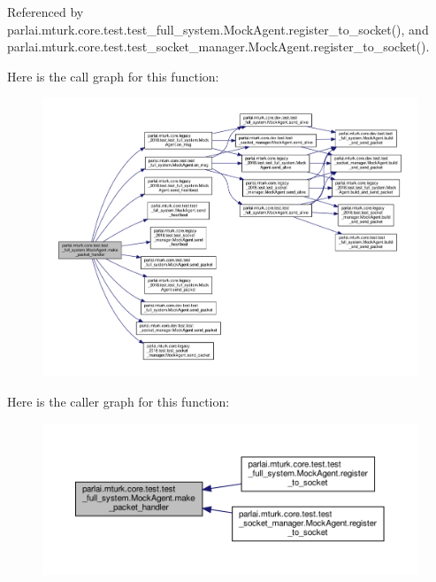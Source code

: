 Referenced by parlai.\+mturk.\+core.\+test.\+test\+\_\+full\+\_\+system.\+Mock\+Agent.\+register\+\_\+to\+\_\+socket(), and parlai.\+mturk.\+core.\+test.\+test\+\_\+socket\+\_\+manager.\+Mock\+Agent.\+register\+\_\+to\+\_\+socket().

Here is the call graph for this function\+:
\nopagebreak
\begin{figure}[H]
\begin{center}
\leavevmode
\includegraphics[width=350pt]{classparlai_1_1mturk_1_1core_1_1test_1_1test__full__system_1_1MockAgent_a872f69350ed59fcccfa5819f2bd65337_cgraph}
\end{center}
\end{figure}
Here is the caller graph for this function\+:
\nopagebreak
\begin{figure}[H]
\begin{center}
\leavevmode
\includegraphics[width=350pt]{classparlai_1_1mturk_1_1core_1_1test_1_1test__full__system_1_1MockAgent_a872f69350ed59fcccfa5819f2bd65337_icgraph}
\end{center}
\end{figure}
\mbox{\label{classparlai_1_1mturk_1_1core_1_1test_1_1test__full__system_1_1MockAgent_a2186b39ea12603dd9c80ca0fca2e6892}} 

